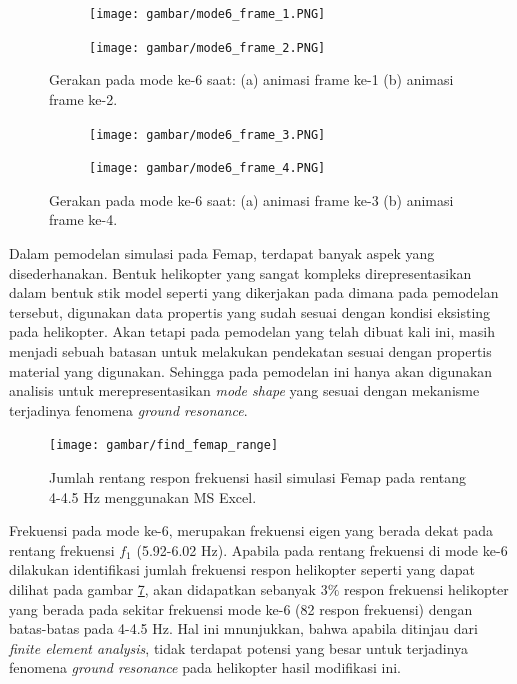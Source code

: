 \begin{figure}[H]
	\begin{subfigure}{0.49\textwidth}
		\centering
		\texttt{[image: gambar/mode6\_frame\_1.PNG]}
		\caption{}
		\label{fig:mode6_frame_1}
	\end{subfigure}
	\centering
	\begin{subfigure}{0.49\textwidth}
		\centering
		\texttt{[image: gambar/mode6\_frame\_2.PNG]}
		\caption{}
		\label{fig:mode6_frame_2}
	\end{subfigure}
	\caption{Gerakan pada mode ke-6 saat: (a) animasi frame ke-1 (b) animasi frame ke-2.}
\end{figure}

\begin{figure}[H]
	\begin{subfigure}{0.49\textwidth}
		\centering
		\texttt{[image: gambar/mode6\_frame\_3.PNG]}
		\caption{}
		\label{fig:mode6_frame_3}
	\end{subfigure}
	\centering
	\begin{subfigure}{0.49\textwidth}
		\centering
		\texttt{[image: gambar/mode6\_frame\_4.PNG]}
		\caption{}
		\label{fig:mode6_frame_4}
	\end{subfigure}
	\caption{Gerakan pada mode ke-6 saat: (a) animasi frame ke-3 (b) animasi frame ke-4.}
\end{figure}

Dalam pemodelan simulasi pada Femap, terdapat banyak aspek yang disederhanakan. Bentuk helikopter yang sangat kompleks direpresentasikan dalam bentuk stik model seperti yang dikerjakan pada \cite{Grzegorz2016THESP} dimana pada pemodelan tersebut, digunakan data propertis yang sudah sesuai dengan kondisi eksisting pada helikopter. Akan tetapi pada pemodelan yang telah dibuat kali ini, masih menjadi sebuah batasan untuk melakukan pendekatan sesuai dengan propertis material yang digunakan. Sehingga pada pemodelan ini hanya akan digunakan analisis untuk merepresentasikan \textit{mode shape} yang sesuai dengan mekanisme terjadinya fenomena \textit{ground resonance}.

\begin{figure}[h]
	\centering
	\texttt{[image: gambar/find\_femap\_range]}
	\caption{Jumlah rentang respon frekuensi hasil simulasi Femap pada rentang 4-4.5 Hz menggunakan MS Excel.}
	\label{fig:fem_range}
\end{figure}


Frekuensi pada mode ke-6, merupakan frekuensi eigen yang berada dekat pada rentang frekuensi $f_1$ (5.92-6.02 Hz). Apabila pada rentang frekuensi di mode ke-6 dilakukan identifikasi jumlah frekuensi respon helikopter seperti yang dapat dilihat pada gambar \ref{fig:fem_range}, akan didapatkan sebanyak $3\%$ respon frekuensi helikopter yang berada pada sekitar frekuensi mode ke-6 (82 respon frekuensi) dengan batas-batas pada 4-4.5 Hz. Hal ini mnunjukkan, bahwa apabila ditinjau dari \textit{finite element analysis}, tidak terdapat potensi yang besar untuk terjadinya fenomena \textit{ground resonance} pada helikopter hasil modifikasi ini. 

